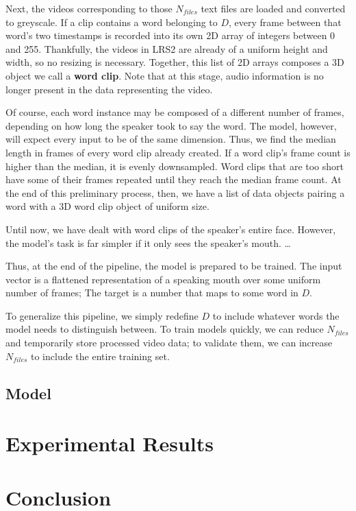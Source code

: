 \documentclass{article}
\begin{document}
Next, the videos corresponding to those $N_{files}$ text files are loaded and converted to greyscale. If a clip contains a word belonging to $D$, every frame between that word's two timestamps is recorded into its own 2D array of integers between 0 and 255. Thankfully, the videos in LRS2 are already of a uniform height and width, so no resizing is necessary. Together, this list of 2D arrays composes a 3D object we call a \textbf{word clip}. Note that at this stage, audio information is no longer present in the data representing the video.

Of course, each word instance may be composed of a different number of frames, depending on how long the speaker took to say the word. The model, however, will expect every input to be of the same dimension. Thus, we find the median length in frames of every word clip already created. If a word clip's frame count is higher than the median, it is evenly downsampled. Word clips that are too short have some of their frames repeated until they reach the median frame count. At the end of this preliminary process, then, we have a list of data objects pairing a word with a 3D word clip object of uniform size.

Until now, we have dealt with word clips of the speaker's entire face. However, the model's task is far simpler if it only sees the speaker's mouth. \dots

Thus, at the end of the pipeline, the model is prepared to be trained. The input vector is a flattened representation of a speaking mouth over some uniform number of frames; The target is a number that maps to some word in $D$.

To generalize this pipeline, we simply redefine $D$ to include whatever words the model needs to distinguish between. To train models quickly, we can reduce $N_{files}$ and temporarily store processed video data; to validate them, we can increase $N_{files}$ to include the entire training set.

\subsection{Model}

\section{Experimental Results}

\section{Conclusion}
\end{document}
